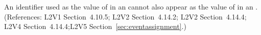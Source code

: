 An identifier used as the value of  in an \EventAssignment
cannot also appear as the value of  in an \AssignmentRule.
(References: L2V1 Section~4.10.5; L2V2 Section~4.14.2; L2V2 Section~4.14.4; L2V4 Section~4.14.4;L2V5 Section~\ref{sec:eventassignment}.)
